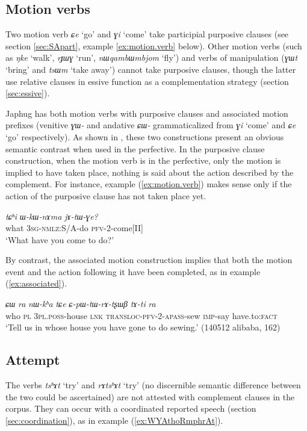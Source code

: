 \documentclass[oneside,a4paper,11pt]{article}
\newcommand{\ipa}[1]{\textit{\phon#1}}
\newcommand{\jpg}[2]{\ipa{#1} `#2'}
\newcommand{\refb}[1]{(\ref{#1})}
\begin{document}
  \subsection{Motion verbs}
Two motion verb \jpg{ɕe}{go} and \jpg{ɣi}{come} take participial purposive clauses (see section \ref{sec:SApart}, example \ref{ex:motion.verb} below). Other motion verbs (such as \jpg{ŋke}{walk}, \jpg{rɟɯɣ}{run}, \jpg{nɯqambɯmbjom}{fly})  and verbs of manipulation (\jpg{ɣɯt}{bring} and \jpg{tsɯm}{take away}) cannot take purposive clauses, though the latter use relative clauses in essive function as a complementation strategy (section \ref{sec:essive}).
 
Japhug has both motion verbs with purposive clauses and associated motion  prefixes (venitive \ipa{ɣɯ-}  and andative \ipa{ɕɯ-} grammaticalized from \jpg{ɣi}{come} and  \jpg{ɕe}{go} respectively). As shown in \citet[203]{jacques13harmonization}, these two constructions present an obvious semantic contrast when used in the perfective. In the purposive clause construction, when the motion verb is in the perfective, only the motion is implied to have taken place, nothing is said about the action described by the  complement. For instance, example \refb{ex:motion.verb} makes sense only if the action of the purposive clause has not taken place yet.

\begin{exe}
\ex \label{ex:motion.verb}
\gll
\ipa{tɕʰi} 	\ipa{ɯ-kɯ-nɤma} 	\ipa{jɤ-tɯ-ɣe?} \\
what \textsc{3sg-nmlz:}S/A-do \textsc{pfv-2}-come[II] \\
\glt `What have you come to do?'
\end{exe} 

By contrast, the associated motion construction implies that both the motion event and the action following it have been completed, as in example \refb{ex:associated}.

\begin{exe}
\ex \label{ex:associated}
\gll
\ipa{ɕɯ} 	\ipa{ra} 	\ipa{nɯ-kʰa} 	\ipa{tɕe} 	\ipa{ɕ-pɯ-tɯ-rɤ-tʂɯβ} \ipa{tɤ-ti} \ipa{ra}\\
who \textsc{pl} \textsc{3pl.poss}-house \textsc{lnk} \textsc{transloc-pfv-2-apass}-sew \textsc{imp}-say  have.to:\textsc{fact} \\
\glt `Tell us in whose house you have gone to do sewing.' (140512 alibaba, 162)
 \end{exe} 

\subsection{Attempt} \label{sec:attempt}
The verbs \jpg{tsʰɤt}{try} and \jpg{rɤtsʰɤt}{try} (no discernible semantic difference between the two could be ascertained) are not attested with complement clauses in the corpus. They can occur with a coordinated reported speech (section \ref{sec:coordination}), as in example \refb{ex:WYAthoRmphrAt}.
 
\end{document}
